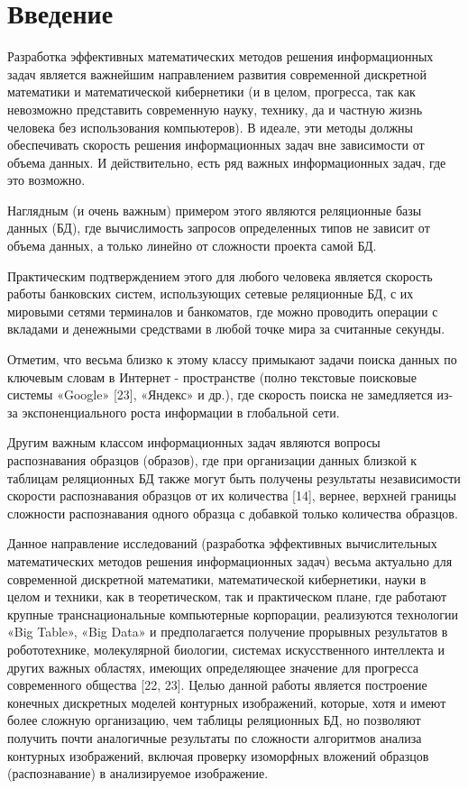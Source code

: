 \chapter*{Введение}							%

Разработка эффективных  математических методов решения информационных задач является важнейшим направлением развития современной  дискретной математики и математической кибернетики (и в целом, прогресса, так как невозможно представить современную науку, технику, да и частную жизнь человека  без использования компьютеров). 
В идеале, эти методы должны обеспечивать скорость решения  информационных задач вне зависимости от объема данных. И действительно, есть ряд важных  информационных задач, где это возможно. 

Наглядным (и очень важным) примером  этого являются реляционные базы данных (БД), где вычислимость запросов определенных типов не зависит от объема данных, а только линейно от сложности проекта самой БД.

Практическим подтверждением этого для любого человека является скорость работы банковских систем, использующих сетевые реляционные БД,  с их мировыми сетями терминалов и банкоматов, где можно проводить операции с вкладами и денежными средствами в любой точке мира за считанные секунды.

Отметим, что весьма близко к этому классу  примыкают задачи поиска данных по ключевым словам в Интернет - пространстве (полно текстовые поисковые системы «Google» [23], «Яндекс» и др.), где скорость поиска не замедляется из-за экспоненциального роста информации в глобальной сети.

Другим  важным классом информационных задач являются вопросы распознавания  образцов (образов), где при организации данных близкой к таблицам реляционных БД также могут быть получены результаты независимости скорости  распознавания  образцов от их количества [14], вернее, верхней границы сложности распознавания одного образца с добавкой только количества образцов. 

Данное направление исследований (разработка эффективных вычислительных математических методов решения информационных задач) весьма актуально для современной дискретной математики, математической кибернетики, науки в целом и техники, как в теоретическом, так и  практическом плане, где работают крупные транснациональные компьютерные корпорации, реализуются технологии «Big Table»,  «Big Data» и предполагается получение прорывных результатов в робототехнике, молекулярной биологии, системах искусственного интеллекта и других важных областях, имеющих определяющее значение для прогресса современного общества [22, 23].
Целью данной работы является построение конечных дискретных моделей контурных изображений, которые, хотя и имеют более сложную организацию, чем  таблицы реляционных БД, но позволяют получить почти аналогичные результаты по  сложности  алгоритмов анализа контурных изображений, включая проверку изоморфных вложений образцов (распознавание) в анализируемое изображение.

